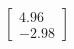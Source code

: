 \documentclass[preview]{standalone}
\begin{document}
\begin{align*}
\begin{bmatrix} 4.96 \\ -2.98 \end{bmatrix}
\end{align*}
\end{document}

